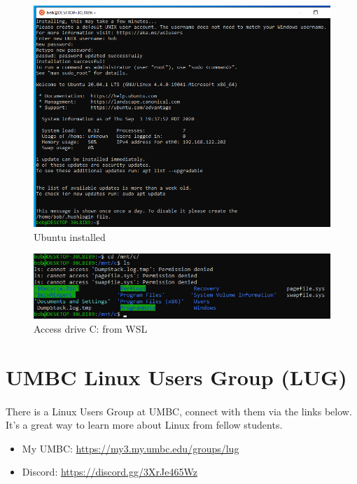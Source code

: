 \documentclass[letter,11pt]{article}
\begin{document}
\begin{figure}
    \centering
    \includegraphics[scale=0.64]{Images/WSL/d.png}
    \caption{Ubuntu installed}
    \label{fig:wslinstallcomplete}
\end{figure}

\begin{figure}
    \centering
    \includegraphics[scale=0.64]{Images/WSL/e.png}
    \caption{Access drive C: from WSL}
    \label{fig:wsldrivec}
\end{figure}

\FloatBarrier

\section{UMBC Linux Users Group (LUG)}
\paragraph{}There is a Linux Users Group at UMBC, connect with them via the links below. It's a great way to learn more about Linux from fellow students.
\begin{itemize}
    \item My UMBC: \url{https://my3.my.umbc.edu/groups/lug}
    \item Discord: \url{https://discord.gg/3XrJe465Wz}
\end{itemize}
\end{document}
